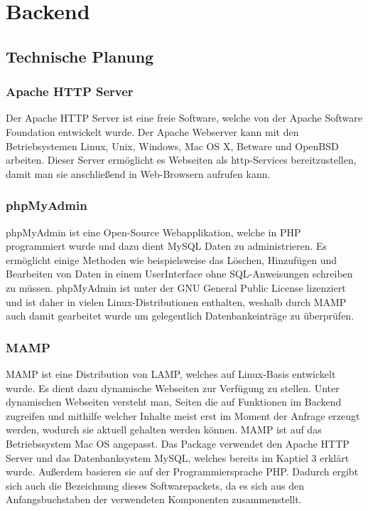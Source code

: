 \section{Backend}

  \subsection{Technische Planung}

    \subsubsection{Apache HTTP Server}

Der {Apache HTTP Server\cite{apachehttpserver}} ist eine freie Software, welche von der Apache Software Foundation entwickelt wurde. Der Apache Webserver kann mit den Betriebsystemen Linux, Unix, Windows, Mac OS X, Betware und OpenBSD arbeiten. Dieser Server ermöglicht es Webseiten als http-Services bereitzustellen, damit man sie anschließend in Web-Browsern aufrufen kann.

    \subsubsection{phpMyAdmin}

{phpMyAdmin\cite{phpmyadmin}} ist eine Open-Source Webapplikation, welche in PHP programmiert wurde und dazu dient MySQL Daten zu administrieren. Es ermöglicht einige Methoden wie beispielsweise das Löschen, Hinzufügen und Bearbeiten von Daten in einem UserInterface ohne SQL-Anweisungen schreiben zu müssen. phpMyAdmin ist unter der GNU General Public License lizenziert und ist daher in vielen Linux-Distributionen enthalten, weshalb durch MAMP auch damit gearbeitet wurde um gelegentlich Datenbankeinträge zu überprüfen.

    \subsubsection{MAMP}

{MAMP\cite{mamp}} ist eine Distribution von LAMP, welches auf Linux-Basis entwickelt wurde. Es dient dazu dynamische Webseiten zur Verfügung zu stellen. Unter dynamischen Webseiten versteht man, Seiten die auf Funktionen im Backend zugreifen und mithilfe welcher Inhalte meist erst im Moment der Anfrage erzeugt werden, wodurch sie aktuell gehalten werden können. MAMP ist auf das Betriebssystem Mac OS angepasst. Das Package verwendet den Apache HTTP Server und das Datenbanksystem MySQL, welches bereits im Kaptiel 3 erklärt wurde. Außerdem basieren sie auf der Programmiersprache PHP. Dadurch ergibt sich auch die Bezeichnung dieses Softwarepackets, da es sich aus den Anfangsbuchstaben der verwendeten Komponenten zusammenstellt.

